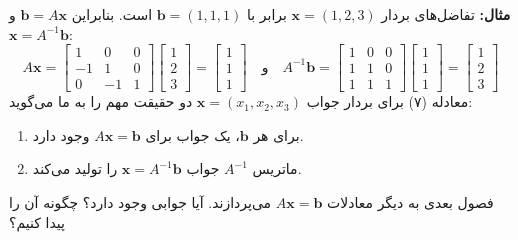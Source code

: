 \documentclass[12pt, a4paper]{book}
\begin{document}
	\textbf{مثال:} تفاضل‌های بردار $\mathbf{x}=(1,2,3)$ برابر با $\mathbf{b}=(1,1,1)$ است. بنابراین $\mathbf{b}=A\mathbf{x}$ و $\mathbf{x}=A^{-1}\mathbf{b}$:
	\[ A\mathbf{x} = \begin{bmatrix} 1 & 0 & 0 \\ -1 & 1 & 0 \\ 0 & -1 & 1 \end{bmatrix} \begin{bmatrix} 1 \\ 2 \\ 3 \end{bmatrix} = \begin{bmatrix} 1 \\ 1 \\ 1 \end{bmatrix} \quad \text{و} \quad A^{-1}\mathbf{b} = \begin{bmatrix} 1 & 0 & 0 \\ 1 & 1 & 0 \\ 1 & 1 & 1 \end{bmatrix} \begin{bmatrix} 1 \\ 1 \\ 1 \end{bmatrix} = \begin{bmatrix} 1 \\ 2 \\ 3 \end{bmatrix} \]
	معادله (۷) برای بردار جواب $\mathbf{x}=(x_1,x_2,x_3)$ دو حقیقت مهم را به ما می‌گوید:
	\begin{enumerate}
		\item برای هر $\mathbf{b}$، یک جواب برای $A\mathbf{x}=\mathbf{b}$ وجود دارد.
		\item ماتریس $A^{-1}$ جواب $\mathbf{x}=A^{-1}\mathbf{b}$ را تولید می‌کند.
	\end{enumerate}
	فصول بعدی به دیگر معادلات $A\mathbf{x}=\mathbf{b}$ می‌پردازند. آیا جوابی وجود دارد؟ چگونه آن را پیدا کنیم؟
	
\end{document}
